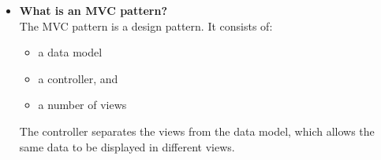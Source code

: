 \documentclass[12pt,letterpaper,titlepage,en-US]{article}
\begin{document}
  \begin{itemize}[nolistsep,noitemsep]
\item  \textbf {What is an MVC pattern?}\\
The MVC pattern is a design pattern. It consists of:
\begin{itemize}[noitemsep,nolistsep]
\item a data model
\item a controller, and
\item a number of views

\end{itemize}
The controller separates the views from the data model, which allows the same data to be displayed in different views.

  \end{itemize}
\end{document}
